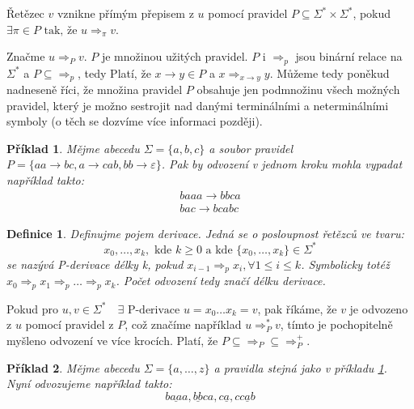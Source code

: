\documentclass[10pt,a4paper]{article}
\theoremstyle{note}
\newtheorem{definice}{Definice}
\newtheorem{priklad}{Příklad}
\begin{document}
		Řetězec $v$ vznikne přímým přepisem z $u$ pomocí pravidel $P \subseteq  \Sigma^{*} \times \Sigma^{*}$, pokud
		$\exists \pi \in P \text{ tak, že } u \Rightarrow_{\pi} v$.

		Značme $u \Rightarrow_{P} v$. $P$ je množinou užitých pravidel. $P$ i $\Rightarrow_{p}$ jsou binární relace
		 na 	$\Sigma^{*}$ a
		$P \subseteq  \Rightarrow_{p}$, tedy  Platí, že $x \rightarrow y \in P$
 		a $x \Rightarrow_{x \rightarrow y} y$.
		Můžeme tedy poněkud nadneseně říci, že množina pravidel $P$ obsahuje jen podmnožinu všech možných pravidel,
		 který je možno sestrojit
		nad danými terminálními a neterminálními symboly (o těch se dozvíme více informaci později).

		\begin{priklad}
		Mějme abecedu $\Sigma = \lbrace a, b, c \rbrace$ a soubor pravidel $P = \lbrace aa \rightarrow bc, a
		 \rightarrow cab, bb \rightarrow \varepsilon \rbrace$\label{priklad-1}.
		Pak by odvození v jednom kroku mohla vypadat například takto:
		\begin{gather*}
		baaa \rightarrow bbca \\
		bac \rightarrow bcabc
		\end{gather*}
		\end{priklad}

\begin{definice}
Definujme pojem \textit{derivace}. Jedná se o posloupnost řetězců ve tvaru:
$$
x_{0}, \ldots, x_{k},\text{ kde } k \geq 0\text{ a kde } \lbrace x_{0}, \ldots, x_{k} \rbrace \in \Sigma^{*}
$$
se nazývá \textit{P-derivace délky k}, pokud $x_{i-1} \Rightarrow_{p} x_{i}, \forall 1 \leq i \leq k $.
Symbolicky totéž $x_{0} \Rightarrow_{p} x_{1} \Rightarrow_{p} \ldots \Rightarrow_{p} x_{k}$. Počet odvození tedy značí \textit{délku} derivace.
\end{definice}

Pokud pro $u, v \in \Sigma^{*} \quad \exists \text{ P-derivace } u = x_{0} \ldots x_{k} = v$, pak říkáme, že $v$ je odvozeno z $u$ pomocí pravidel z $P$, což značíme
například $u \Rightarrow_{P}^{*} v$, tímto je pochopitelně myšleno odvození ve více krocích. Platí, že $P \subseteq \Rightarrow_{P} \subseteq \Rightarrow_{P}^{+}$.

\begin{priklad}
Mějme abecedu $\Sigma = \lbrace a, \ldots, z \rbrace$ a pravidla stejná jako v příkladu \ref{priklad-1}.
Nyní odvozujeme například takto:
$$
b\underline{aa}a, \underline{bb}ca, c\underline{a}, c\underline{cab}
$$
\end{priklad}
\end{document}
